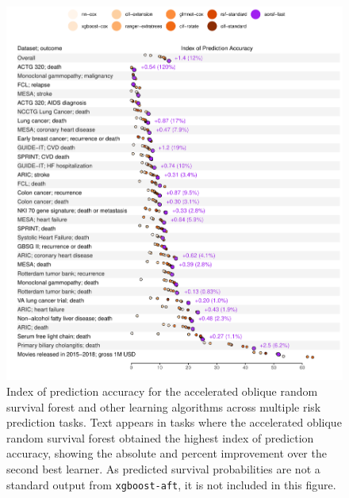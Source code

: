 \documentclass{article}\usepackage[]{graphicx}\usepackage[]{xcolor}
\makeatletter
\def\maxwidth{ %
  \ifdim\Gin@nat@width>\linewidth
    \linewidth
  \else
    \Gin@nat@width
  \fi
}
\newenvironment{knitrout}{}{} %
\makeatother
\begin{document}
\begin{knitrout}
\color{fgcolor}\begin{figure}
\includegraphics[width=\maxwidth]{figure/bm_pred_viz_ibs-1} \caption[Index of prediction accuracy for the accelerated oblique random survival forest and other learning algorithms across multiple risk prediction tasks]{Index of prediction accuracy for the accelerated oblique random survival forest and other learning algorithms across multiple risk prediction tasks. Text appears in tasks where the accelerated oblique random survival forest obtained the highest index of prediction accuracy, showing the absolute and percent improvement over the second best learner. As predicted survival probabilities are not a standard output from \texttt{xgboost-aft}, it is not included in this figure.}\label{fig:bm_pred_viz_ibs}
\end{figure}

\end{knitrout}
\end{document}
